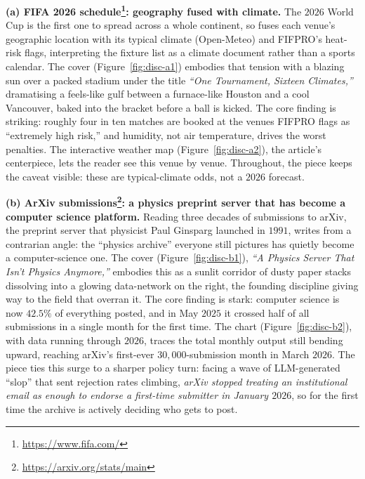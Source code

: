 \textbf{(a) FIFA 2026 schedule\footnote{\url{https://www.fifa.com/}}: geography fused with climate.} 
The $2026$ World Cup is the first one to spread across a whole continent, so \methodshort{} fuses each venue's geographic location with its typical climate (Open-Meteo) and FIFPRO's heat-risk flags, interpreting the fixture list as a climate document rather than a sports calendar. The cover (Figure~\ref{fig:disc-a1}) embodies that tension with a blazing sun over a packed stadium under the title \textit{``One Tournament, Sixteen Climates,''} dramatising a feels-like gulf between a furnace-like Houston and a cool Vancouver, baked into the bracket before a ball is kicked. The core finding is striking: roughly four in ten matches are booked at the venues FIFPRO flags as ``extremely high risk,'' and humidity, not air temperature, drives the worst penalties. The interactive weather map (Figure~\ref{fig:disc-a2}), the article's centerpiece, lets the reader see this venue by venue. Throughout, the piece keeps the caveat visible: these are typical-climate odds, not a $2026$ forecast.

\textbf{(b) ArXiv submissions\footnote{\url{https://arxiv.org/stats/main}}: a physics preprint server that has become a computer science platform.} Reading three decades of submissions to arXiv, the preprint server that physicist Paul Ginsparg launched in $1991$, \methodshort{} writes from a contrarian angle: the ``physics archive'' everyone still pictures has quietly become a computer-science one. 
The cover (Figure~\ref{fig:disc-b1}), \textit{``A Physics Server That Isn't Physics Anymore,''} embodies this as a sunlit corridor of dusty paper stacks dissolving into a glowing data-network on the right, the founding discipline giving way to the field that overran it. 
The core finding is stark: computer science is now $42.5\%$ of everything posted, and in May $2025$ it crossed half of all submissions in a single month for the first time. 
The chart (Figure~\ref{fig:disc-b2}), with data running through $2026$, traces the total monthly output still bending upward, reaching arXiv's first-ever $30,000$-submission month in March $2026$. The piece ties this surge to a sharper policy turn: facing a wave of LLM-generated ``slop'' that sent rejection rates climbing, \textit{arXiv stopped treating an institutional email as enough to endorse a first-time submitter in January $2026$}, so for the first time the archive is actively deciding who gets to post.

